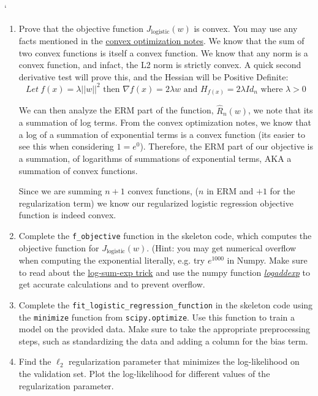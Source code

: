 `\documentclass{article}
\theoremstyle{plain}
\theoremstyle{definition}
\begin{document}
\begin{enumerate}
  \setcounter{enumi}{\value{saveenum}}
\item Prove that the objective function $J_{\text{logistic}}(w)$ is convex.
You may use any facts mentioned in the \href{https://davidrosenberg.github.io/mlcourse/Notes/convex-optimization.pdf}{convex optimization notes}.
\subitem
We know that the sum of two convex functions is itself a convex function. We know that any norm is a convex function, and infact, the L2 norm is strictly convex. A quick second derivative test will prove this, and the Hessian will be Positive Definite: $$ Let \ f(x) = \lambda ||w||^2 \text{ then } \nabla f(x) = 2\lambda w \text{ and } H_{f(x)} = 2\lambda Id_n  \text{ where } \lambda >0$$

We can then analyze the ERM part of the function, $\hat{R}_n(w)$, we note that its a summation of log terms. From the convex optimization notes, we know that a log of a summation of exponential terms is a convex function (its easier to see this when considering $1=e^0$). Therefore, the ERM part of our objective is a summation, of logarithms of summations of exponential terms, AKA a summation of convex functions.

Since we are summing $n+1$ convex functions, ($n$ in ERM and $+1$ for the regularization term) we know our regularized logistic regression objective function is indeed convex. 

\item Complete the \texttt{f\_objective} function in the skeleton code,
which computes the objective function for $J_{\text{logistic}}(w)$.
(Hint: you may get numerical overflow when computing the exponential literally,
e.g. try $e^{1000}$ in Numpy.
Make sure to read about the
\href{https://blog.feedly.com/tricks-of-the-trade-logsumexp/}{log-sum-exp trick}
and use the numpy function
\textit{ \href{https://docs.scipy.org/doc/numpy/reference/generated/numpy.logaddexp.html}{logaddexp}
}
to get accurate calculations
and to prevent overflow.

\item Complete the \texttt{fit\_logistic\_regression\_function} in the skeleton
code using the \texttt{minimize} function from \texttt{scipy.optimize}.
Use this function to train
a model on the provided data. Make sure to take the appropriate preprocessing
steps, such as standardizing the data and adding a column for the
bias term. 

\item Find the $\ell_{2}$ regularization parameter that minimizes the log-likelihood
on the validation set. Plot the log-likelihood for different values
of the regularization parameter. 


\end{enumerate}
\end{document}
